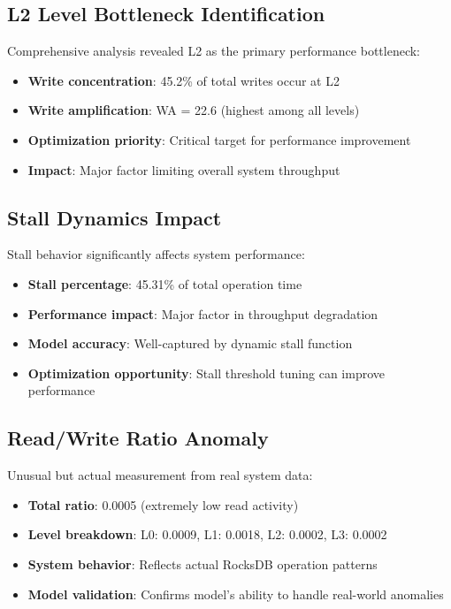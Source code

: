 \documentclass[11pt]{article}
\begin{document}
\subsection{L2 Level Bottleneck Identification}

Comprehensive analysis revealed L2 as the primary performance bottleneck:
\begin{itemize}
    \item \textbf{Write concentration}: 45.2\% of total writes occur at L2
    \item \textbf{Write amplification}: WA = 22.6 (highest among all levels)
    \item \textbf{Optimization priority}: Critical target for performance improvement
    \item \textbf{Impact}: Major factor limiting overall system throughput
\end{itemize}

\subsection{Stall Dynamics Impact}

Stall behavior significantly affects system performance:
\begin{itemize}
    \item \textbf{Stall percentage}: 45.31\% of total operation time
    \item \textbf{Performance impact}: Major factor in throughput degradation
    \item \textbf{Model accuracy}: Well-captured by dynamic stall function
    \item \textbf{Optimization opportunity}: Stall threshold tuning can improve performance
\end{itemize}

\subsection{Read/Write Ratio Anomaly}

Unusual but actual measurement from real system data:
\begin{itemize}
    \item \textbf{Total ratio}: 0.0005 (extremely low read activity)
    \item \textbf{Level breakdown}: L0: 0.0009, L1: 0.0018, L2: 0.0002, L3: 0.0002
    \item \textbf{System behavior}: Reflects actual RocksDB operation patterns
    \item \textbf{Model validation}: Confirms model's ability to handle real-world anomalies
\end{itemize}
\end{document}
